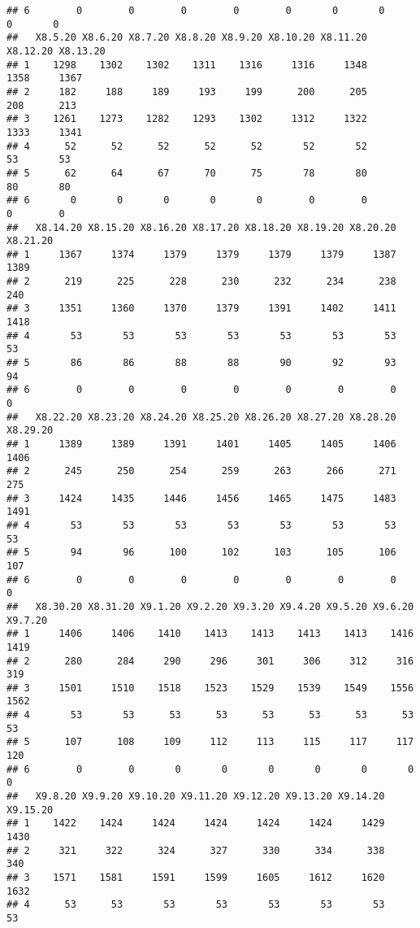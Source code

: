 \documentclass[
]{article}
\begin{document}
\begin{verbatim}
## 6        0        0        0        0        0       0       0       0       0
##   X8.5.20 X8.6.20 X8.7.20 X8.8.20 X8.9.20 X8.10.20 X8.11.20 X8.12.20 X8.13.20
## 1    1298    1302    1302    1311    1316     1316     1348     1358     1367
## 2     182     188     189     193     199      200      205      208      213
## 3    1261    1273    1282    1293    1302     1312     1322     1333     1341
## 4      52      52      52      52      52       52       52       53       53
## 5      62      64      67      70      75       78       80       80       80
## 6       0       0       0       0       0        0        0        0        0
##   X8.14.20 X8.15.20 X8.16.20 X8.17.20 X8.18.20 X8.19.20 X8.20.20 X8.21.20
## 1     1367     1374     1379     1379     1379     1379     1387     1389
## 2      219      225      228      230      232      234      238      240
## 3     1351     1360     1370     1379     1391     1402     1411     1418
## 4       53       53       53       53       53       53       53       53
## 5       86       86       88       88       90       92       93       94
## 6        0        0        0        0        0        0        0        0
##   X8.22.20 X8.23.20 X8.24.20 X8.25.20 X8.26.20 X8.27.20 X8.28.20 X8.29.20
## 1     1389     1389     1391     1401     1405     1405     1406     1406
## 2      245      250      254      259      263      266      271      275
## 3     1424     1435     1446     1456     1465     1475     1483     1491
## 4       53       53       53       53       53       53       53       53
## 5       94       96      100      102      103      105      106      107
## 6        0        0        0        0        0        0        0        0
##   X8.30.20 X8.31.20 X9.1.20 X9.2.20 X9.3.20 X9.4.20 X9.5.20 X9.6.20 X9.7.20
## 1     1406     1406    1410    1413    1413    1413    1413    1416    1419
## 2      280      284     290     296     301     306     312     316     319
## 3     1501     1510    1518    1523    1529    1539    1549    1556    1562
## 4       53       53      53      53      53      53      53      53      53
## 5      107      108     109     112     113     115     117     117     120
## 6        0        0       0       0       0       0       0       0       0
##   X9.8.20 X9.9.20 X9.10.20 X9.11.20 X9.12.20 X9.13.20 X9.14.20 X9.15.20
## 1    1422    1424     1424     1424     1424     1424     1429     1430
## 2     321     322      324      327      330      334      338      340
## 3    1571    1581     1591     1599     1605     1612     1620     1632
## 4      53      53       53       53       53       53       53       53

\end{verbatim}
\end{document}
